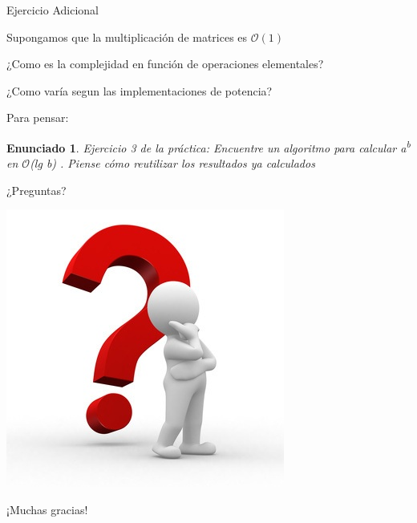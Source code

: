 \documentclass[pdf]{beamer}
\newtheorem{enun}{Enunciado}
\begin{document}
\begin{frame}{Ejercicio Adicional}
    \par{Supongamos que la multiplicación de matrices es $\mathcal{O}(1)$}
    \par{¿Como es la complejidad en función de operaciones elementales?}
    
    \pause
    \vspace{1em}
    ¿Como varía segun las implementaciones de potencia?
    
    \pause
    \vspace{1em}
    Para pensar:
    
    \begin{enun}
	Ejercicio 3 de la práctica:
	Encuentre un algoritmo para calcular a\textsuperscript{b} en $\mathcal{O}$(lg b) . Piense cómo reutilizar los resultados
	ya calculados
	
    \end{enun}
    
\end{frame}

\begin{frame}
    \huge{¿Preguntas?}
    \begin{center}
        \includegraphics[scale=0.4]{img/question-mark.jpg}
    \end{center}
    \large{¡Muchas gracias!}
\end{frame}
\end{document}
